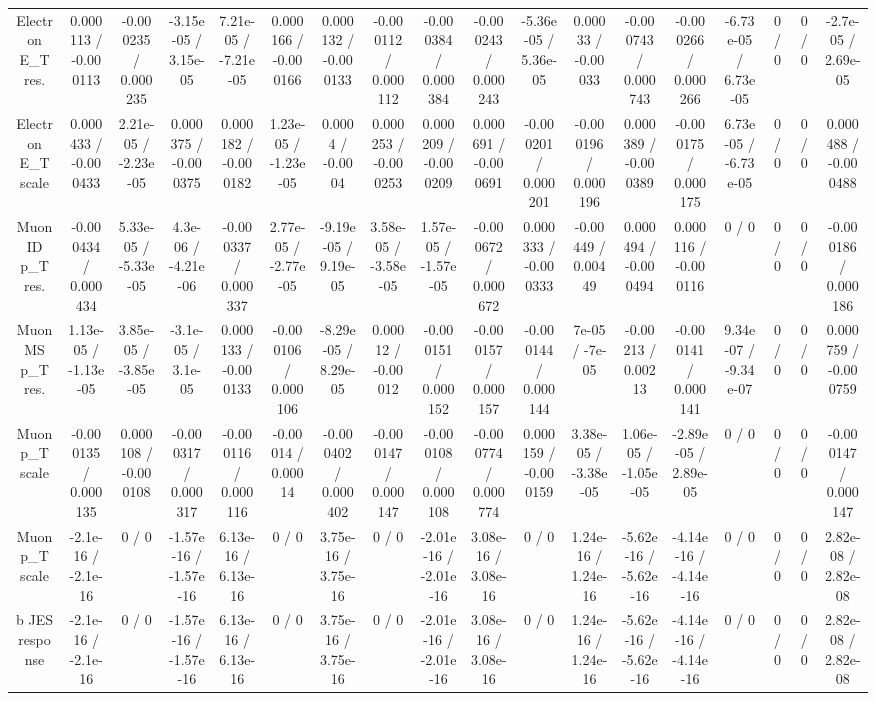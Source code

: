 \documentclass[10pt]{article}
\begin{document}
\begin{table}[htbp]
\begin{center}
\begin{tabular}{|c|c|c|c|c|c|c|c|c|c|c|c|c|c|c|c|c|c|}
  Electron E_{T} res. & 0.000113 / -0.000113 & -0.000235 / 0.000235 & -3.15e-05 / 3.15e-05 & 7.21e-05 / -7.21e-05 & 0.000166 / -0.000166 & 0.000132 / -0.000133 & -0.000112 / 0.000112 & -0.000384 / 0.000384 & -0.000243 / 0.000243 & -5.36e-05 / 5.36e-05 & 0.00033 / -0.00033 & -0.000743 / 0.000743 & -0.000266 / 0.000266 & -6.73e-05 / 6.73e-05 & 0 / 0 & 0 / 0 & -2.7e-05 / 2.69e-05 \\ 
  Electron E_{T} scale & 0.000433 / -0.000433 & 2.21e-05 / -2.23e-05 & 0.000375 / -0.000375 & 0.000182 / -0.000182 & 1.23e-05 / -1.23e-05 & 0.0004 / -0.0004 & 0.000253 / -0.000253 & 0.000209 / -0.000209 & 0.000691 / -0.000691 & -0.000201 / 0.000201 & -0.000196 / 0.000196 & 0.000389 / -0.000389 & -0.000175 / 0.000175 & 6.73e-05 / -6.73e-05 & 0 / 0 & 0 / 0 & 0.000488 / -0.000488 \\ 
  Muon ID p_{T} res. & -0.000434 / 0.000434 & 5.33e-05 / -5.33e-05 & 4.3e-06 / -4.21e-06 & -0.000337 / 0.000337 & 2.77e-05 / -2.77e-05 & -9.19e-05 / 9.19e-05 & 3.58e-05 / -3.58e-05 & 1.57e-05 / -1.57e-05 & -0.000672 / 0.000672 & 0.000333 / -0.000333 & -0.00449 / 0.00449 & 0.000494 / -0.000494 & 0.000116 / -0.000116 & 0 / 0 & 0 / 0 & 0 / 0 & -0.000186 / 0.000186 \\ 
  Muon MS p_{T} res. & 1.13e-05 / -1.13e-05 & 3.85e-05 / -3.85e-05 & -3.1e-05 / 3.1e-05 & 0.000133 / -0.000133 & -0.000106 / 0.000106 & -8.29e-05 / 8.29e-05 & 0.00012 / -0.00012 & -0.000151 / 0.000152 & -0.000157 / 0.000157 & -0.000144 / 0.000144 & 7e-05 / -7e-05 & -0.00213 / 0.00213 & -0.000141 / 0.000141 & 9.34e-07 / -9.34e-07 & 0 / 0 & 0 / 0 & 0.000759 / -0.000759 \\ 
  Muon p_{T} scale & -0.000135 / 0.000135 & 0.000108 / -0.000108 & -0.000317 / 0.000317 & -0.000116 / 0.000116 & -0.00014 / 0.00014 & -0.000402 / 0.000402 & -0.000147 / 0.000147 & -0.000108 / 0.000108 & -0.000774 / 0.000774 & 0.000159 / -0.000159 & 3.38e-05 / -3.38e-05 & 1.06e-05 / -1.05e-05 & -2.89e-05 / 2.89e-05 & 0 / 0 & 0 / 0 & 0 / 0 & -0.000147 / 0.000147 \\ 
  Muon p_{T} scale & -2.1e-16 / -2.1e-16 & 0 / 0 & -1.57e-16 / -1.57e-16 & 6.13e-16 / 6.13e-16 & 0 / 0 & 3.75e-16 / 3.75e-16 & 0 / 0 & -2.01e-16 / -2.01e-16 & 3.08e-16 / 3.08e-16 & 0 / 0 & 1.24e-16 / 1.24e-16 & -5.62e-16 / -5.62e-16 & -4.14e-16 / -4.14e-16 & 0 / 0 & 0 / 0 & 0 / 0 & 2.82e-08 / 2.82e-08 \\ 
  b JES response & -2.1e-16 / -2.1e-16 & 0 / 0 & -1.57e-16 / -1.57e-16 & 6.13e-16 / 6.13e-16 & 0 / 0 & 3.75e-16 / 3.75e-16 & 0 / 0 & -2.01e-16 / -2.01e-16 & 3.08e-16 / 3.08e-16 & 0 / 0 & 1.24e-16 / 1.24e-16 & -5.62e-16 / -5.62e-16 & -4.14e-16 / -4.14e-16 & 0 / 0 & 0 / 0 & 0 / 0 & 2.82e-08 / 2.82e-08 \\ 

\end{tabular}
\end{center}
\end{table}
\end{document}
